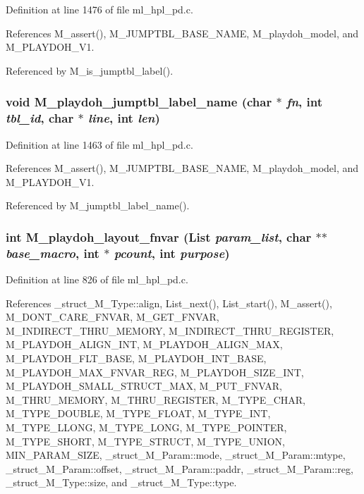 Definition at line 1476 of file ml\_\-hpl\_\-pd.c.

References M\_\-assert(), M\_\-JUMPTBL\_\-BASE\_\-NAME, M\_\-playdoh\_\-model, and M\_\-PLAYDOH\_\-V1.

Referenced by M\_\-is\_\-jumptbl\_\-label().
\subsubsection{\setlength{\rightskip}{0pt plus 5cm}void M\_\-playdoh\_\-jumptbl\_\-label\_\-name (char $\ast$ {\em fn}, int {\em tbl\_\-id}, char $\ast$ {\em line}, int {\em len})}\label{ml__hpl__pd_8c_d6189b87d37f8f493d876ffac491a270}




Definition at line 1463 of file ml\_\-hpl\_\-pd.c.

References M\_\-assert(), M\_\-JUMPTBL\_\-BASE\_\-NAME, M\_\-playdoh\_\-model, and M\_\-PLAYDOH\_\-V1.

Referenced by M\_\-jumptbl\_\-label\_\-name().
\subsubsection{\setlength{\rightskip}{0pt plus 5cm}int M\_\-playdoh\_\-layout\_\-fnvar (\bf{List} {\em param\_\-list}, char $\ast$$\ast$ {\em base\_\-macro}, int $\ast$ {\em pcount}, int {\em purpose})}\label{ml__hpl__pd_8c_2cfdd8166897c97bc5dd08cac92e3e1e}




Definition at line 826 of file ml\_\-hpl\_\-pd.c.

References \_\-struct\_\-M\_\-Type::align, List\_\-next(), List\_\-start(), M\_\-assert(), M\_\-DONT\_\-CARE\_\-FNVAR, M\_\-GET\_\-FNVAR, M\_\-INDIRECT\_\-THRU\_\-MEMORY, M\_\-INDIRECT\_\-THRU\_\-REGISTER, M\_\-PLAYDOH\_\-ALIGN\_\-INT, M\_\-PLAYDOH\_\-ALIGN\_\-MAX, M\_\-PLAYDOH\_\-FLT\_\-BASE, M\_\-PLAYDOH\_\-INT\_\-BASE, M\_\-PLAYDOH\_\-MAX\_\-FNVAR\_\-REG, M\_\-PLAYDOH\_\-SIZE\_\-INT, M\_\-PLAYDOH\_\-SMALL\_\-STRUCT\_\-MAX, M\_\-PUT\_\-FNVAR, M\_\-THRU\_\-MEMORY, M\_\-THRU\_\-REGISTER, M\_\-TYPE\_\-CHAR, M\_\-TYPE\_\-DOUBLE, M\_\-TYPE\_\-FLOAT, M\_\-TYPE\_\-INT, M\_\-TYPE\_\-LLONG, M\_\-TYPE\_\-LONG, M\_\-TYPE\_\-POINTER, M\_\-TYPE\_\-SHORT, M\_\-TYPE\_\-STRUCT, M\_\-TYPE\_\-UNION, MIN\_\-PARAM\_\-SIZE, \_\-struct\_\-M\_\-Param::mode, \_\-struct\_\-M\_\-Param::mtype, \_\-struct\_\-M\_\-Param::offset, \_\-struct\_\-M\_\-Param::paddr, \_\-struct\_\-M\_\-Param::reg, \_\-struct\_\-M\_\-Type::size, and \_\-struct\_\-M\_\-Type::type.

